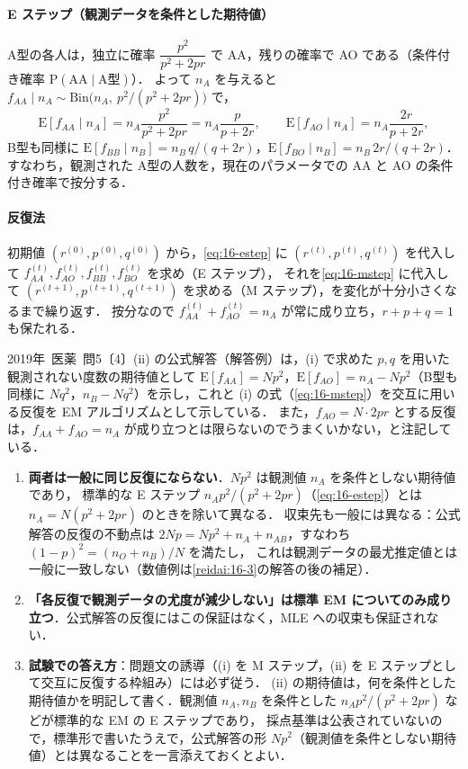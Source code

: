 \documentclass[a4paper,11pt,openany]{ltjsbook}
\newcommand{\kakomon}[2]{\mbox{#1年 医薬 問#2}}
\newcommand{\E}{\mathrm{E}}
\newcommand{\Prob}{\mathrm{P}}
\newcommand{\Bin}{\mathrm{Bin}}
\begin{document}
\paragraph{E ステップ（観測データを条件とした期待値）}
A型の各人は，独立に確率 $\dfrac{p^2}{p^2+2pr}$ で AA，残りの確率で AO である（条件付き確率 $\Prob(\text{AA}\mid\text{A型})$）．
よって $n_A$ を与えると $f_{AA}\mid n_A\sim\Bin\bigl(n_A,\ p^2/(p^2+2pr)\bigr)$ で，
\begin{equation}
\E[f_{AA}\mid n_A]=n_A\frac{p^2}{p^2+2pr}=n_A\frac{p}{p+2r},\qquad \E[f_{AO}\mid n_A]=n_A\frac{2r}{p+2r},\label{eq:16-estep}
\end{equation}
B型も同様に $\E[f_{BB}\mid n_B]=n_B\,q/(q+2r)$，$\E[f_{BO}\mid n_B]=n_B\,2r/(q+2r)$．
すなわち，観測された A型の人数を，現在のパラメータでの AA と AO の条件付き確率で按分する．
\paragraph{反復法}
初期値 $(r^{(0)},p^{(0)},q^{(0)})$ から，\cref{eq:16-estep} に $(r^{(t)},p^{(t)},q^{(t)})$ を代入して $f_{AA}^{(t)},f_{AO}^{(t)},f_{BB}^{(t)},f_{BO}^{(t)}$ を求め（E ステップ），
それを\cref{eq:16-mstep} に代入して $(r^{(t+1)},p^{(t+1)},q^{(t+1)})$ を求める（M ステップ），を変化が十分小さくなるまで繰り返す．
按分なので $f_{AA}^{(t)}+f_{AO}^{(t)}=n_A$ が常に成り立ち，$r+p+q=1$ も保たれる．

\begin{warnbox}[試験の公式解答との相違]
\kakomon{2019}{5}〔4〕(ii) の公式解答（解答例）は，(i) で求めた $p,q$ を用いた観測されない度数の期待値として
$\E[f_{AA}]=Np^2$，$\E[f_{AO}]=n_A-Np^2$（B型も同様に $Nq^2$，$n_B-Nq^2$）を示し，これと (i) の式（\cref{eq:16-mstep}）を交互に用いる反復を EM アルゴリズムとして示している．
また，$f_{AO}=N\cdot2pr$ とする反復は，$f_{AA}+f_{AO}=n_A$ が成り立つとは限らないのでうまくいかない，と注記している．
\begin{enumerate}[label=(\arabic*)]
\item \textbf{両者は一般に同じ反復にならない}．$Np^2$ は観測値 $n_A$ を条件としない期待値であり，
      標準的な E ステップ $n_Ap^2/(p^2+2pr)$（\cref{eq:16-estep}）とは $n_A=N(p^2+2pr)$ のときを除いて異なる．
      収束先も一般には異なる：公式解答の反復の不動点は $2Np=Np^2+n_A+n_{AB}$，すなわち $(1-p)^2=(n_O+n_B)/N$ を満たし，
      これは観測データの最尤推定値とは一般に一致しない（数値例は\cref{reidai:16-3}の解答の後の補足）．
\item \textbf{「各反復で観測データの尤度が減少しない」は標準 EM についてのみ成り立つ}．公式解答の反復にはこの保証はなく，MLE への収束も保証されない．
\item \textbf{試験での答え方}：問題文の誘導（(i) を M ステップ，(ii) を E ステップとして交互に反復する枠組み）には必ず従う．
      (ii) の期待値は，何を条件とした期待値かを明記して書く．観測値 $n_A,n_B$ を条件とした $n_Ap^2/(p^2+2pr)$ などが標準的な EM の E ステップであり，
      採点基準は公表されていないので，標準形で書いたうえで，公式解答の形 $Np^2$（観測値を条件としない期待値）とは異なることを一言添えておくとよい．
\end{enumerate}
\end{warnbox}
\end{document}
